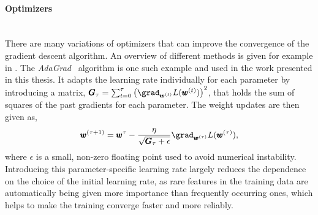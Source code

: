 
\paragraph{Optimizers}\mbox{}\\
There are many variations of optimizers that can improve the convergence of the gradient descent algorithm. An overview of different methods is given for example in . The \emph{AdaGrad}~\cite{adagrad-duchi} algorithm is one such example and used in the work presented in this thesis. It adapts the learning rate individually for each parameter by introducing a matrix, $\pmb{G}_{\tau} = \sum_{t=0}^{\tau} \left( \grad_{\pmb{w}^{(t)}} L(\pmb{w}^{(t)}) \right)^2$, that holds the sum of squares of the past gradients for each parameter. 
The weight updates are then given as,
\begin{equation}
    \pmb{w}^{(\tau+1)} = \pmb{w}^\tau - \frac{\eta}{\sqrt{\pmb{G}_\tau + \epsilon}}  \grad_{\pmb{w}^{(\tau)}} L(\pmb{w}^{(\tau)}), 
\end{equation}
where $\epsilon$ is a small, non-zero floating point used to avoid numerical instability.
Introducing this parameter-specific learning rate largely reduces the dependence on the choice of the initial learning rate, as rare features in the training data are automatically being given more importance than frequently occurring ones, which helps to make the training converge faster and more reliably.


